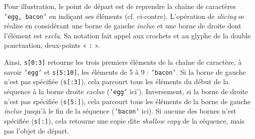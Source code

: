 Pour illustration, le point de départ est de reprendre la chaîne de caractères \texttt{'egg, bacon'} en indiçant ses éléments (cf. ci-contre). L'opération de \textit{slicing} se réalise en considérant une borne de gauche \emph{inclue} et une borne de droite dont l'élément est \emph{exclu}. Sa notation fait appel aux crochets et au glyphe de la double ponctuation, deux-points « \texttt{:} ».

Ainsi, \texttt{s[0:3]} retourne les trois premiers éléments de la chaîne de caractère, à savoir \texttt{'egg'} et \texttt{s[5:10]}, les éléments de 5 à 9 : \texttt{'bacon'}.
Si la borne de gauche n'est pas spécifiée (\texttt{s[:3]}), cela parcourt tous les éléments du début de la séquence à la borne droite \emph{exclue} (\texttt{'egg'} ici'). Inversement, si la borne de droite n'est pas spécifiée (\texttt{s[5:]}), cela parcourt tous les éléments de la borne de gauche \emph{inclue} jusqu'à le fin de la séquence (\texttt{'bacon'} ici). Si aucune des bornes n'est spécifiée (\texttt{s[:]}), cela retourne une copie dite \textit{shallow copy} de la séquence, mais pas l'objet de départ.

